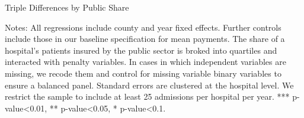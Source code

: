 \documentclass[12pt]{article}
\begin{document}
\newpage
{}
\setlength{\captionmargin}{.5 \textwidth} \addtolength{\captionmargin}{-.5\wd\gfxbox}
\begin{table}[!h]
\centering
\caption{Triple Differences by Public Share}
\label{tab:publicshare}
\usebox{\gfxbox}
\par
\begin{minipage}{\wd\gfxbox}
\footnotesize
Notes: All regressions include county and year fixed effects.  Further controls include those in our baseline specification for mean payments.  The share of a hospital's patients insured by the public sector is broked into quartiles and interacted with penalty variables.  In cases in which independent variables are missing, we recode them and control for missing variable binary variables to ensure a balanced panel.  Standard errors are clustered at the hospital level.  We restrict the sample to include at least 25 admissions per hospital per year.  *** p-value<0.01, ** p-value<0.05, * p-value<0.1.
\end{minipage}
\end{table}
\end{document}

